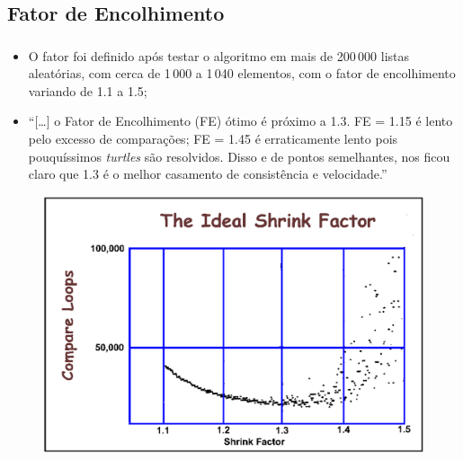 \documentclass[aspectratio=169,table]{beamer}
\begin{document}
	\subsection{Fator de Encolhimento}
		\begin{frame}
			\frametitle{\secname}
			\framesubtitle{\subsecname}
			\begin{itemize}
				\item O fator foi definido após testar o algoritmo em mais de 200\,000 listas aleatórias, com cerca de 1\,000 a 1\,040 elementos, com o fator de encolhimento variando de 1.1 a 1.5;
				\item ``[\dots] o Fator de Encolhimento (FE) ótimo é próximo a 1.3. FE = 1.15 é lento pelo excesso de comparações; FE = 1.45 é erraticamente lento pois pouquíssimos \textit{turtles} são resolvidos. Disso e de pontos semelhantes, nos ficou claro que 1.3 é o melhor casamento de consistência e velocidade.''\cite{comb1991}
			\end{itemize}
			\begin{figure}
				\includegraphics[height=.3\textheight]{Imagens/gap_image}
				\label{fig:perguntas}
			\end{figure}
		\end{frame}


\end{document}
